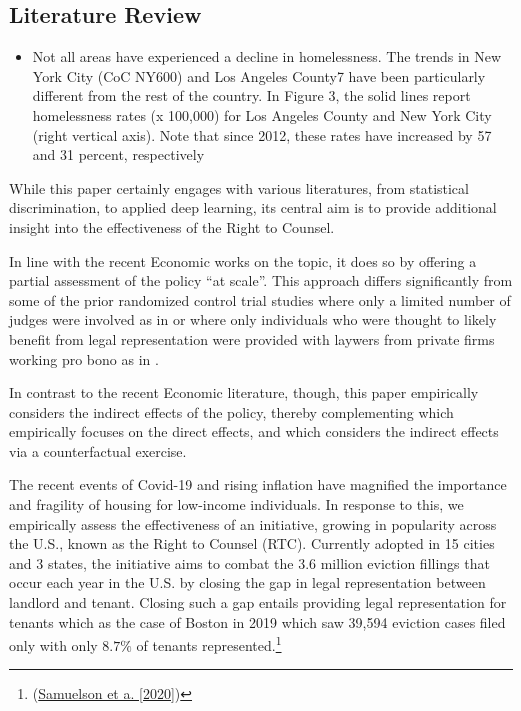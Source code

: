 \documentclass[a4paper,12pt]{article}
\begin{document}
\subsection{Literature Review}
\begin{itemize}
    \item Not all areas have experienced a decline in homelessness. The trends in New York City (CoC NY600) and Los Angeles County7 have been particularly different from the rest of the country. In Figure 3, the solid lines report homelessness rates (x 100,000) for Los Angeles County and New York City (right vertical
axis). Note that since 2012, these rates have increased by 57 and 31 percent, respectively
\end{itemize}
While this paper certainly engages with various literatures, from statistical discrimination, to applied deep learning, its central aim is to provide additional insight into the effectiveness of the Right to Counsel. \par 
 In line with the recent Economic works on the topic, it does so by offering a partial assessment of the policy ``at scale''. This approach differs significantly from some of the prior randomized control trial studies where only a limited number of judges were involved as in \cite{greiner2012limits} or where only individuals who were thought to likely benefit from legal representation were provided with laywers from private firms working pro bono as in \cite{seron2001impact}.   

In contrast to the recent Economic literature, though, this paper empirically considers the indirect effects of the policy, thereby complementing \cite{cassidy2022effects} which empirically focuses on the direct effects, and \cite{abramson2021welfare} which considers the indirect effects via a counterfactual exercise.


The recent events of Covid-19 and rising inflation have magnified the importance and fragility of housing for low-income individuals. In response to this, we empirically assess the effectiveness of an initiative, growing in popularity across the U.S., known as the Right to Counsel (RTC). Currently adopted in 15 cities and 3 states, the initiative aims to combat the 3.6 million eviction fillings that occur each year in the U.S. by closing the gap in legal representation between landlord and tenant. Closing such a gap entails providing legal representation for tenants which as the case of Boston in 2019 which saw 39,594 eviction cases filed only  with only $8.7\%$ of tenants represented.\footnote{(\href{https://bostonbar.org/app/uploads/2022/06/rtc-report-for-web-or-email.pdf}{Samuelson et a. [2020]})}
\end{document}
